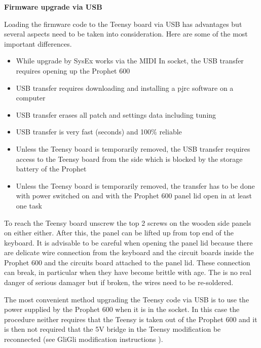 \textbf{Firmware upgrade via USB}

Loading the firmware code to the Teensy board via USB has advantages but several aspects need to be taken into consideration. Here are some of the most important differences.

\begin{itemize}
  \item While upgrade by SysEx works via the MIDI In socket, the USB transfer requires opening up the Prophet 600
  \item USB transfer requires downloading and installing a pjrc software on a computer    
  \item USB transfer erases all patch and settings data including tuning
  \item USB transfer is very fast (seconds) and 100\% reliable
  \item Unless the Teensy board is temporarily removed, the USB transfer requires access to the Teensy board from the side which is blocked by the storage battery of the Prophet
  \item Unless the Teensy board is temporarily removed, the transfer has to be done with power switched on and with the Prophet 600 panel lid open in at least one task 
\end{itemize}

To reach the Teensy board unscrew the top 2 screws on the wooden side panels on either either. After this, the panel can be lifted up from top end of the keyboard. It is advisable to be careful when opening the panel lid because there are delicate wire connection from the keyboard and the circuit boards inside the Prophet 600 and the circuits board attached to the panel lid. These connection can break, in particular when they have become brittle with age. The is no real danger of serious damager but if broken, the wires need to be re-soldered.


The most convenient method upgrading the Teensy code via USB is to use the power supplied by the Prophet 600 when it is in the socket. In this case the procedure neither requires that the Teensy is taken out of the Prophet 600 and it is then not required that the 5V bridge in the Teensy modification be reconnected (see GliGli modification instructions \cite{modinstructions}). 

